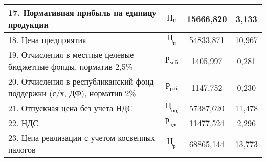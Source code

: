 {\begin{longtable}{| m{10.7cm} | c | c | c |}
      17. Нормативная прибыль на единицу продукции
      & \( \text{П}_{\text{н}} \) & 15666{,}820 & 3{,}133 \\
      \hline

      18. Цена предприятия
      & \( \mathbf{\text{Ц}_{\text{п}}} \) & 54833{,}871 & 10{,}967 \\
      \hline

      19. Отчисления в местные целевые бюджетные фонды, \newline
      норматив 2{,}5\%
      & \( \text{Р}_{\text{м.б}} \) & 1405{,}997 & 0{,}281 \\
      \hline

      20. Отчисления в республиканский фонд поддержки \newline
      (с/х, ДФ), норматив 2\%
      & \( \text{Р}_{\text{р.б}} \) & 1147{,}752 & 0{,}230 \\
      \hline

      21. Отпускная цена без учета НДС
      & \( \text{Ц}_{\text{оц}} \) & 57387{,}620 & 11{,}478 \\
      \hline

      22. НДС
      & \( \text{Р}_{\text{ндс}} \) & 11477{,}524 & 2{,}296 \\
      \hline

      23. Цена реализации с учетом косвенных налогов
      & \( \text{Ц}_{\text{р}} \) & 68865{,}144 & 13{,}773 \\
      \hline 
\end{longtable}
}
